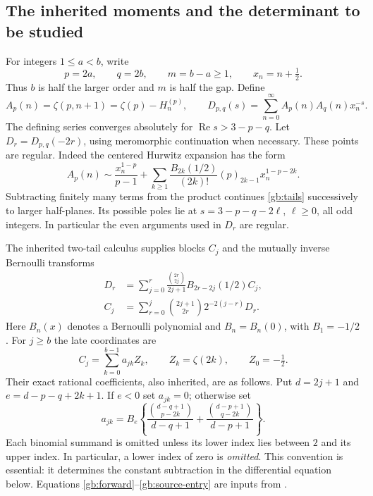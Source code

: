 \documentclass[11pt,a4paper]{article}
\numberwithin{equation}{section}
\theoremstyle{definition}
\theoremstyle{remark}
\newcommand{\Rea}{\operatorname{Re}}
\begin{document}
\subsection{The inherited moments and the determinant to be studied}

For integers $1\le a<b$, write
\[
 p=2a,\qquad q=2b,\qquad m=b-a\ge1,
 \qquad x_n=n+\tfrac12.
\]
Thus $b$ is half the larger order and $m$ is half the gap.  Define
\begin{equation}\label{gb:tails}
 A_p(n)=\zeta(p,n+1)=\zeta(p)-H_n^{(p)},\qquad
 D_{p,q}(s)=\sum_{n=0}^{\infty}A_p(n)A_q(n)x_n^{-s}.
\end{equation}
The defining series converges absolutely for $\Rea s>3-p-q$.
Let $D_r=D_{p,q}(-2r)$, using meromorphic continuation when necessary.
These points are regular.  Indeed the centered Hurwitz expansion has
the form
\[
 A_p(n)\sim\frac{x_n^{1-p}}{p-1}
 +\sum_{k\ge1}\frac{B_{2k}(1/2)}{(2k)!}
       (p)_{2k-1}x_n^{1-p-2k}.
\]
Subtracting finitely many terms from the product continues
\eqref{gb:tails} successively to larger half-planes.  Its possible poles
lie at $s=3-p-q-2\ell$, $\ell\ge0$, all odd integers.  In particular
the even arguments used in $D_r$ are regular.

The inherited two-tail calculus supplies blocks $C_j$ and the mutually
inverse Bernoulli transforms
\begin{align}
 D_r&=\sum_{j=0}^r\frac{\binom{2r}{2j}}{2j+1}
          B_{2r-2j}(1/2)C_j,\label{gb:forward}\\
 C_j&=\sum_{r=0}^j\binom{2j+1}{2r}2^{-2(j-r)}D_r.
 \label{gb:inverse}
\end{align}
Here $B_n(x)$ denotes a Bernoulli polynomial and $B_n=B_n(0)$, with
$B_1=-1/2$.  For $j\ge b$ the late coordinates are
\begin{equation}\label{gb:late}
 C_j=\sum_{k=0}^{b-1}a_{jk}Z_k,\qquad
 Z_k=\zeta(2k),\qquad Z_0=-\tfrac12.
\end{equation}
Their exact rational coefficients, also inherited, are as follows.
Put $d=2j+1$ and $e=d-p-q+2k+1$.  If $e<0$ set $a_{jk}=0$;
otherwise set
\begin{equation}\label{gb:source-entry}
 a_{jk}=B_e\left\{
 \frac{\binom{d-q+1}{p-2k}}{d-q+1}
 +\frac{\binom{d-p+1}{q-2k}}{d-p+1}\right\}.
\end{equation}
Each binomial summand is omitted unless its lower index lies between
$2$ and its upper index.  In particular, a lower index of zero is
\emph{omitted}.  This convention is essential: it determines the
constant subtraction in the differential equation below.  Equations
\eqref{gb:forward}--\eqref{gb:source-entry} are inputs from
\cite[Section~2, inherited moment coordinates]{repo-gamma}.
\end{document}
